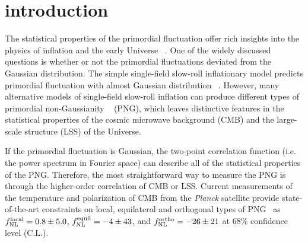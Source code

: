 \documentclass[twocolumn,floatfix,nofootinbib,aps,reprint]{revtex4}
\begin{document}
\section{introduction}
\label{sec:intro}
The statistical properties of the primordial fluctuation offer 
rich insights into the physics of inflation and the early Universe
~\cite{2004PhR...402..103B}.
One of the widely discussed questions is whether or not the 
primordial fluctuations deviated from the Gaussian distribution.
The simple single-field slow-roll inflationary model predicts 
primordial fluctuation with almost Gaussian distribution
~\cite{1992PhRvD..46.4232F,2003NuPhB.667..119A,2003JHEP...05..013M}.
However, many alternative models of single-field slow-roll inflation can
produce different types of primordial non-Gaussianity
~\cite{1997PhRvD..56..535L,2003PhRvD..67b3503L,
2004PhRvD..70l3505A, 2006JCAP...05..004C,2007JCAP...01..002C, 
2008JCAP...05..001H,2009JCAP...05..018M,2011JCAP...01..030A,
2011JCAP...03..025A,2014JCAP...02..025A} (PNG), 
which leaves distinctive features in the statistical properties of the 
cosmic microwave background (CMB)
and the large-scale structure (LSS) of the Universe.

If the primordial fluctuation is Gaussian, the two-point correlation function (i.e. the power spectrum in Fourier space) can describe all of the statistical properties of the PNG. Therefore, the most straightforward way to measure the PNG is through the higher-order correlation of CMB or LSS. Current measurements of the temperature and polarization of CMB from the {\it Planck} satellite provide state-of-the-art constraints on local, equilateral and orthogonal types of PNG~\cite{2016A&A...594A..17P} as $f_{\rm NL}^{\rm local}=0.8 \pm 5.0$, $f_{\rm NL}^{\rm equil}=-4 \pm 43$, and $f_{\rm NL}^{\rm ortho}=-26 \pm 21$ at $68\%$ confidence level (C.L.).
\end{document}
